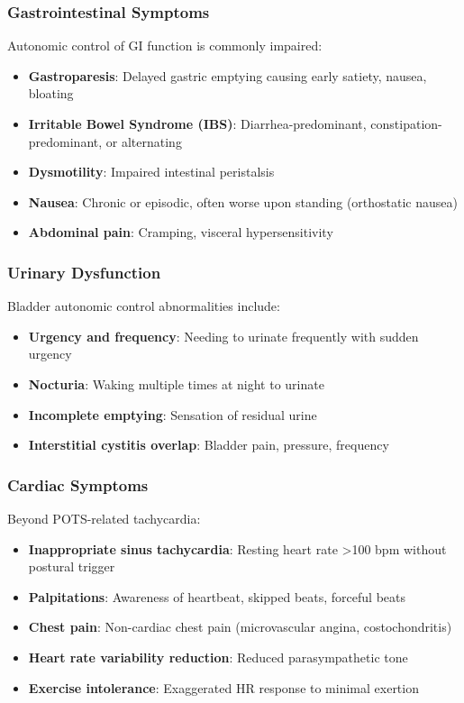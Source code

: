 \subsubsection{Gastrointestinal Symptoms}

Autonomic control of GI function is commonly impaired:
\begin{itemize}
    \item \textbf{Gastroparesis}: Delayed gastric emptying causing early satiety, nausea, bloating
    \item \textbf{Irritable Bowel Syndrome (IBS)}: Diarrhea-predominant, constipation-predominant, or alternating
    \item \textbf{Dysmotility}: Impaired intestinal peristalsis
    \item \textbf{Nausea}: Chronic or episodic, often worse upon standing (orthostatic nausea)
    \item \textbf{Abdominal pain}: Cramping, visceral hypersensitivity
\end{itemize}

\subsubsection{Urinary Dysfunction}

Bladder autonomic control abnormalities include:
\begin{itemize}
    \item \textbf{Urgency and frequency}: Needing to urinate frequently with sudden urgency
    \item \textbf{Nocturia}: Waking multiple times at night to urinate
    \item \textbf{Incomplete emptying}: Sensation of residual urine
    \item \textbf{Interstitial cystitis overlap}: Bladder pain, pressure, frequency
\end{itemize}

\subsubsection{Cardiac Symptoms}

Beyond POTS-related tachycardia:
\begin{itemize}
    \item \textbf{Inappropriate sinus tachycardia}: Resting heart rate >100 bpm without postural trigger
    \item \textbf{Palpitations}: Awareness of heartbeat, skipped beats, forceful beats
    \item \textbf{Chest pain}: Non-cardiac chest pain (microvascular angina, costochondritis)
    \item \textbf{Heart rate variability reduction}: Reduced parasympathetic tone
    \item \textbf{Exercise intolerance}: Exaggerated HR response to minimal exertion
\end{itemize}

